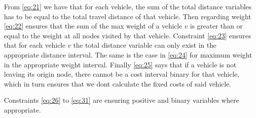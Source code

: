 \documentclass[../main.tex]{subfiles}
\begin{document}
From \ref{eq:21} we have that for each vehicle, the sum of the total distance variables has to be equal to the total travel distance of that vehicle.
Then regarding weight \ref{eq:22} ensures that the sum of the max weight of a vehicle $v$ is greater than or equal to the weight at all nodes visited by that vehicle.
Constraint \ref{eq:23} ensures that for each vehicle $v$ the total distance variable can only exist in the appropriate distance interval.
The same is the case in \ref{eq:24} for maximum weight in the appropriate weight interval.
Finally \ref{eq:25} says that if a vehicle is not leaving its origin node, there cannot be a cost interval binary for that vehicle, which in turn ensures that we dont calculate the fixed costs of said vehicle. \par
Constraints \ref{eq:26} to \ref{eq:31} are ensuring positive and binary variables where appropriate.  \par


\biblio                                                         
\end{document}
